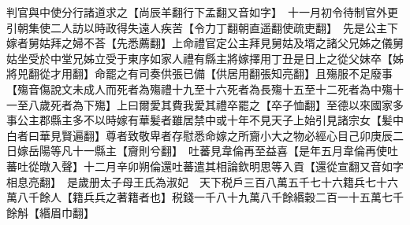 判官與中使分行諸道求之【尚辰羊翻行下孟翻又音如字】　十一月初令待制官外更引朝集使二人訪以時政得失遠人疾苦【令力丁翻朝直遥翻使疏吏翻】　先是公主下嫁者舅姑拜之婦不荅【先悉薦翻】上命禮官定公主拜見舅姑及壻之諸父兄姊之儀舅姑坐受於中堂兄姊立受于東序如家人禮有縣主將嫁擇用丁丑是日上之從父妺卒【姊將兕翻從才用翻】命罷之有司奏供張已備【供居用翻張知亮翻】且殤服不足廢事【殤音傷說文未成人而死者為殤禮十九至十六死者為長殤十五至十二死者為中殤十一至八歲死者為下殤】上曰爾愛其費我愛其禮卒罷之【卒子恤翻】至德以來國家多事公主郡縣主多不以時嫁有華髪者雖居禁中或十年不見天子上始引見諸宗女【髪中白者曰華見賢遍翻】尊者致敬卑者存慰悉命嫁之所齎小大之物必經心目己卯庚辰二日嫁岳陽等凡十一縣主【齎則兮翻】　吐蕃見韋倫再至益喜【是年五月韋倫再使吐蕃吐從暾入聲】十二月辛卯朔倫還吐蕃遣其相論欽明思等入貢【還從宣翻又音如字相息亮翻】　是歲册太子母王氏為淑妃　天下税戶三百八萬五千七十六籍兵七十六萬八千餘人【籍兵兵之著籍者也】税錢一千八十九萬八千餘緡穀二百一十五萬七千餘斛【緡眉巾翻】

